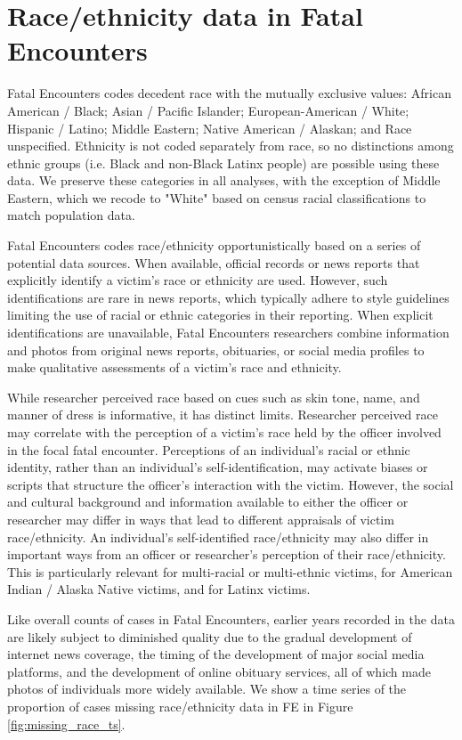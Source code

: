 \documentclass{article}
\begin{document}
\section*{Race/ethnicity data in Fatal Encounters}

Fatal Encounters codes decedent race with the mutually exclusive values: African American / Black; Asian / Pacific Islander; European-American / White; Hispanic / Latino; Middle Eastern; Native American / Alaskan; and Race unspecified. Ethnicity is not coded separately from race, so no distinctions among ethnic groups (i.e. Black and non-Black Latinx people) are possible using these data. We preserve these categories in all analyses, with the exception of Middle Eastern, which we recode to "White" based on census racial classifications to match population data. 

Fatal Encounters codes race/ethnicity opportunistically based on a series of potential data sources. When available, official records or news reports that explicitly identify a victim's race or ethnicity are used. However, such identifications are rare in news reports, which typically adhere to style guidelines limiting the use of racial or ethnic categories in their reporting. When explicit identifications are unavailable, Fatal Encounters researchers combine information and photos from original news reports, obituaries, or social media profiles to make qualitative assessments of a victim's race and ethnicity. 

While researcher perceived race based on cues such as skin tone, name, and manner of dress is informative, it has distinct limits. Researcher perceived race may correlate with the perception of a victim's race held by the officer involved in the focal fatal encounter. Perceptions of an individual's racial or ethnic identity, rather than an individual's self-identification, may activate biases or scripts that structure the officer's interaction with the victim. However, the social and cultural background and information available to either the officer or researcher may differ in ways that lead to different appraisals of victim race/ethnicity. An individual's self-identified race/ethnicity may also differ in important ways from an officer or researcher's perception of their race/ethnicity. This is particularly relevant for multi-racial or multi-ethnic victims, for American Indian / Alaska Native victims, and for Latinx victims. 

Like overall counts of cases in Fatal Encounters, earlier years recorded in the data are likely subject to diminished quality due to the gradual development of internet news coverage, the timing of the development of major social media platforms, and the development of online obituary services, all of which made photos of individuals more widely available. We show a time series of the proportion of cases missing race/ethnicity data in FE in Figure \ref{fig:missing_race_ts}.
\end{document}
